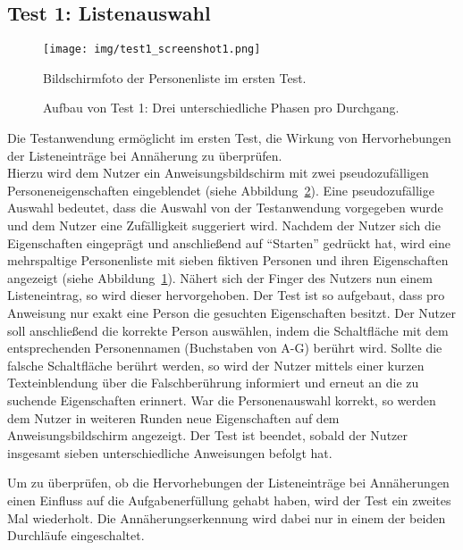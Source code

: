 \documentclass[12pt,numbers=noenddot,parskip,bibliography=totocnumbered,listof=totocnumbered]{scrreprt}
\begin{document}
\subsection{Test 1: Listenauswahl}
\begin{figure}
\centering
\texttt{[image: img/test1\_screenshot1.png]}
\caption{Bildschirmfoto der Personenliste im ersten Test.}
\label{test1screenshot}
\end{figure}
\begin{figure}
\centering
{}
\vfill
{}
\vfill
{}
\caption{Aufbau von Test 1: Drei unterschiedliche Phasen pro Durchgang.}
\label{test1phasen}
\end{figure}
Die Testanwendung ermöglicht im ersten Test, die Wirkung von Hervorhebungen der Listeneinträge bei Annäherung zu überprüfen.\\
Hierzu wird dem Nutzer ein Anweisungsbildschirm mit zwei pseudozufälligen Personeneigenschaften eingeblendet (siehe Abbildung~\ref{test1phasen}). Eine pseudozufällige Auswahl bedeutet, dass die Auswahl von der Testanwendung vorgegeben wurde und dem Nutzer eine Zufälligkeit suggeriert wird. Nachdem der Nutzer sich die Eigenschaften eingeprägt und anschließend auf "`Starten"' gedrückt hat, wird eine mehrspaltige Personenliste mit sieben fiktiven Personen und ihren Eigenschaften angezeigt (siehe Abbildung~\ref{test1screenshot}). Nähert sich der Finger des Nutzers nun einem Listeneintrag, so wird dieser hervorgehoben. Der Test ist so aufgebaut, dass pro Anweisung nur exakt eine Person die gesuchten Eigenschaften besitzt. Der Nutzer soll anschließend die korrekte Person auswählen, indem die Schaltfläche mit dem entsprechenden Personennamen (Buchstaben von A-G) berührt wird. Sollte die falsche Schaltfläche berührt werden, so wird der Nutzer mittels einer kurzen Texteinblendung über die Falschberührung informiert und erneut an die zu suchende Eigenschaften erinnert. War die Personenauswahl korrekt, so werden dem Nutzer in weiteren Runden neue Eigenschaften auf dem Anweisungsbildschirm angezeigt. Der Test ist beendet, sobald der Nutzer insgesamt sieben unterschiedliche Anweisungen befolgt hat.

Um zu überprüfen, ob die Hervorhebungen der Listeneinträge bei Annäherungen einen Einfluss auf die Aufgabenerfüllung gehabt haben, wird der Test ein zweites Mal wiederholt. Die Annäherungserkennung wird dabei nur in einem der beiden Durchläufe eingeschaltet.
\end{document}
